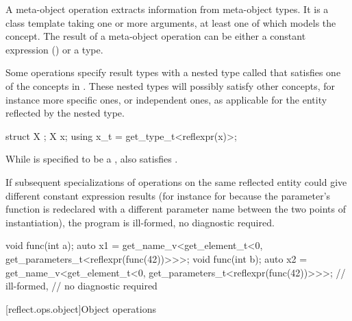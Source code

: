 \begin{std.txt}\color{addclr}
\pnum
A meta-object operation extracts information from meta-object types. It is a class template taking one or more arguments, at least one of which models the  concept. The result of a meta-object operation can be either a constant expression () or a type.

\pnum
Some operations specify result types with a nested type called  that satisfies one of the concepts in .
These nested types will possibly satisfy other concepts, for instance more specific ones, or independent ones, as applicable for the entity reflected by the nested type.
\begin{example}\begin{codeblock}
struct X {};
X x;
using x_t = get_type_t<reflexpr(x)>;\end{codeblock}
While  is specified to be a ,  also satisfies . \end{example}

\pnum
If subsequent specializations of operations on the same reflected entity could give different constant expression results (for instance for  because the parameter's function is redeclared with a different parameter name between the two points of instantiation), the program is ill-formed, no diagnostic required.
   \begin{example}\begin{codeblock}
void func(int a);
auto x1 = get_name_v<get_element_t<0, get_parameters_t<reflexpr(func(42))>>>;
void func(int b);
auto x2 = get_name_v<get_element_t<0, get_parameters_t<reflexpr(func(42))>>>; // ill-formed,
                                                                    // no diagnostic required\end{codeblock}
\end{example}

\end{std.txt}

[reflect.ops.object]{Object operations}

